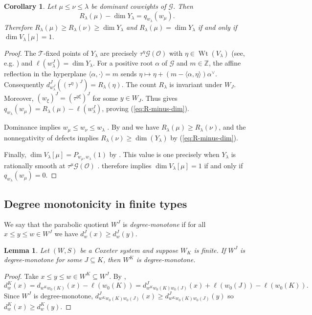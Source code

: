 \documentclass[11pt]{amsart}
\newtheorem{lemma}[lemma]{Lemma}
\newtheorem{corollary}[corollary]{Corollary}
\theoremstyle{definition}
\theoremstyle{remark}
\numberwithin{equation}{section}
\newcommand{\Z}{\mathbb Z}
\begin{document}
\begin{corollary}\label{cor:weight-count}
Let $\mu\le \nu \leq \lambda$ be dominant coweights of $\mathcal{G}$.
Then
\begin{equation}
\label{eq:R-minus-dim}
R_\lambda(\mu)-\dim Y_\lambda=q_{w_\lambda}(w_\mu).
\end{equation}
Therefore $R_\lambda(\mu)\ge R_\lambda(\nu)\ge\dim Y_\lambda$ and
$R_\lambda(\mu)=\dim Y_\lambda$ if and only if
$\dim V_\lambda[\mu]=1$.
\end{corollary}
\begin{proof}
The $\mathcal{T}$-fixed points of $Y_\lambda$ are precisely
$\tau^\eta \mathcal{G}(\mathcal O)$ with
$\eta\in\operatorname{Wt}(V_\lambda)$
(see, e.g. \cite[Rem.~3.3]{MV}) and $\ell(w_\lambda^J)=\dim Y_\lambda$. For a positive root $\alpha$ of $\mathcal{G}$ and $m\in\Z$,
the affine reflection in the hyperplane
$\langle\alpha,\cdot\rangle=m$ sends $\eta\longmapsto
 \eta+(m-\langle\alpha,\eta\rangle)\alpha^\vee$. Consequently $d_{w_\lambda^J}^J((\tau^\eta)^J)=R_\lambda(\eta)$. The count $R_\lambda$ is invariant under $W_J$.
Moreover, $(w_\xi)^J=(\tau^{y\xi})^J$ for some
$y\in W_J$. Thus  gives $q_{w_\lambda}(w_\mu) 
 =R_\lambda(\mu)-\ell(w_\lambda^J)$, proving (\ref{eq:R-minus-dim}).

Dominance implies $w_\mu\le w_\nu\le w_\lambda$
\cite[\S2]{LusztigWeights}.
By  and  we have $R_\lambda(\mu) \geq R_{\lambda}(\nu)$, and the nonnegativity of defects \cite{DyerDeodhar} implies $R_{\lambda}(\nu) \geq \dim(Y_\lambda)$ by (\ref{eq:R-minus-dim}).

Finally, $\dim V_\lambda[\mu]=P_{w_\mu,w_\lambda}(1)$ by
\cite[Thm.~6.1]{LusztigWeights}.
This value is one precisely when $Y_\lambda$ is rationally
smooth at $\tau^\mu \mathcal{G}(\mathcal O)$
\cite[Rem.~2.3]{HainesRicharz}.
 therefore implies $\dim V_\lambda[\mu]=1$ if and only if $q_{w_\lambda}(w_\mu)=0$.
\end{proof}

\subsection{Degree monotonicity in finite types}\label{sub:degree-monotone-finite-type}
We say that the parabolic quotient $W^J$ is \emph{degree-monotone} if for all $x\leq y\leq w\in W^J$ we have $d_w^J(x)\geq d_w^J(y)$.
\begin{lemma}
\label{lem:W-K-degree-monotone}
Let $(W,S)$ be a Coxeter system and suppose $W_K$ is finite. If $W^J$ is degree-monotone for some $J\subseteq K$, then $W^K$ is degree-monotone.  
\end{lemma}
\begin{proof}
Take $x\leq y\leq w\in W^K\subseteq W^J$. By , \[d_w^K(x)=d_{w^Kw_0(K)}(x)-\ell(w_0(K))=d^J_{w^Kw_0(K)w_0(J)}(x)+\ell(w_0(J))-\ell(w_0(K)).\]
Since $W^J$ is degree-monotone, $d^J_{w^Kw_0(K)w_0(J)}(x)\geq d^J_{w^Kw_0(K)w_0(J)}(y)$ so $d_w^K(x)\geq d_w^K(y)$. 
\end{proof}
\end{document}
